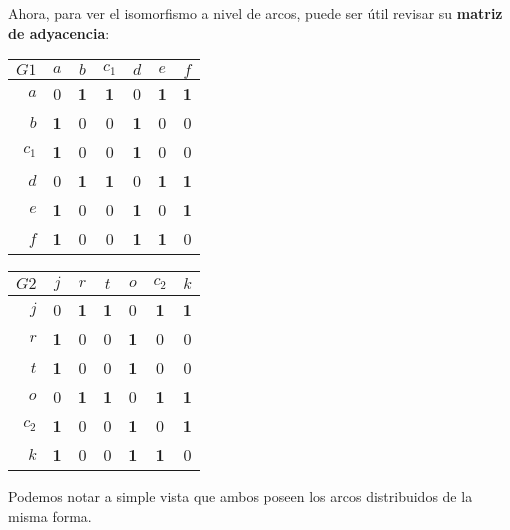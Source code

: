 \documentclass[letterpaper,10pt]{article}
\begin{document}
\begin{enumerate}[a)]
\newpage

Ahora, para ver el isomorfismo a nivel de arcos, puede ser útil revisar su \textbf{matriz de adyacencia}:

\vspace{1em}

\begin{minipage}{0.5\textwidth}
  \begin{center}
    \begin{tabular}{ r | c c c c c c}
      $G1$ & $a$ & $b$ & $c_1$ & $d$ & $e$ & $f$ \\
      \hline
      $a$   &0&\textbf{1}&\textbf{1}&0&\textbf{1}&\textbf{1}\\
      $b$   &\textbf{1}&0&0&\textbf{1}&0&0 \\
      $c_1$ &\textbf{1}&0&0&\textbf{1}&0&0 \\
      $d$   &0&\textbf{1}&\textbf{1}&0&\textbf{1}&\textbf{1} \\
      $e$   &\textbf{1}&0&0&\textbf{1}&0&\textbf{1} \\
      $f$   &\textbf{1}&0&0&\textbf{1}&\textbf{1}&0 \\
    \end{tabular}
  \end{center}
\end{minipage}
\begin{minipage}{0.4\textwidth}
  \begin{center}
    \begin{tabular}{ r | c c c c c c}
      $G2$ & $j$ & $r$ & $t$ & $o$ & $c_2$ & $k$ \\
      \hline
      $j$   &0&\textbf{1}&\textbf{1}&0&\textbf{1}&\textbf{1}\\
      $r$   &\textbf{1}&0&0&\textbf{1}&0&0 \\
      $t$ &\textbf{1}&0&0&\textbf{1}&0&0 \\
      $o$   &0&\textbf{1}&\textbf{1}&0&\textbf{1}&\textbf{1} \\
      $c_2$   &\textbf{1}&0&0&\textbf{1}&0&\textbf{1} \\
      $k$   &\textbf{1}&0&0&\textbf{1}&\textbf{1}&0 \\
    \end{tabular}
  \end{center}
\end{minipage}

\vspace{1em}

Podemos notar a simple vista que ambos poseen los arcos distribuidos de la misma forma.


\end{enumerate}
\end{document}
